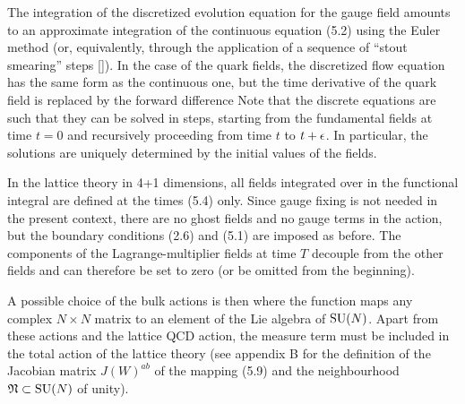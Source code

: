 The integration of the discretized evolution equation 
for the gauge field amounts to an approximate integration of the 
continuous equation (5.2) using the Euler method
(or, equivalently, through the application
of a sequence of ``stout smearing'' steps [\cite{Stout}]).
In the case
of the quark fields, the discretized flow equation has the 
same form as the continuous one, but the time derivative 
of the quark field is replaced by the forward difference
Note that the discrete equations are such that they can be
solved in steps,
starting from the fundamental fields at time $t=0$
and recursively proceeding from time $t$ to $t+\epsilon$.
In particular, the solutions are uniquely determined by the
initial values of the fields.

In the lattice theory in 4+1 dimensions, all fields integrated
over in the functional integral are defined at the times (5.4)
only. 
Since gauge fixing is not needed in the present context,
there are no ghost fields and no gauge terms in the action,
but the boundary conditions (2.6) and (5.1) are imposed 
as before.
The components of the Lagrange-multiplier fields at time $T$ 
decouple from the other fields and can therefore be set
to zero (or be omitted from the beginning). 

A possible choice
of the bulk actions is then
where the function
maps any complex $N\times N$ matrix to an element of the Lie algebra
of ${\rm SU}(N)$. Apart from these actions and the lattice QCD action,
the measure term
must be included in the total action of the lattice theory (see appendix B
for the definition of the Jacobian matrix $J(W)^{ab}$ of the mapping (5.9) 
and the neighbourhood $\mathfrak{N}\subset{\rm SU}(N)$ of unity). 

